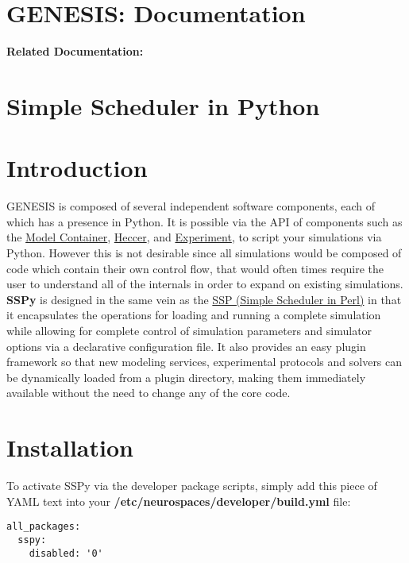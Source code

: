 \documentclass[12pt]{article}
\begin{document}
\section*{GENESIS: Documentation}

{\bf Related Documentation:}

\section*{Simple Scheduler in Python}

\section*{Introduction}

	GENESIS is composed of several independent software components, each of which has a presence in Python. It is possible via the API of components such as the \href{../model-container/model-container.tex}{Model Container}, \href{../heccer/heccer.tex}{Heccer}, and \href{../experiment/experiment.tex}{Experiment}, to script your simulations via Python. However this is not desirable since all simulations would be composed of code which contain their own control flow, that would often times require the user to understand all of the internals in order to expand on existing simulations. {\bf SSPy} is designed in the same vein as the \href{../ssp/ssp.tex}{SSP (Simple Scheduler in Perl)} in that it encapsulates the operations for loading and running a complete simulation while allowing for complete control of simulation parameters and simulator options via a declarative configuration file. It also provides an easy plugin framework so that new modeling services, experimental protocols and solvers can be dynamically loaded from a plugin directory, making them immediately available without the need to change any of the core code.  


\section*{Installation}

To activate SSPy via the developer package scripts, simply add this piece of YAML text into your {\bf /etc/neurospaces/developer/build.yml} file:

\begin{verbatim}
all_packages:
  sspy:
    disabled: '0'
\end{verbatim}
\end{document}
